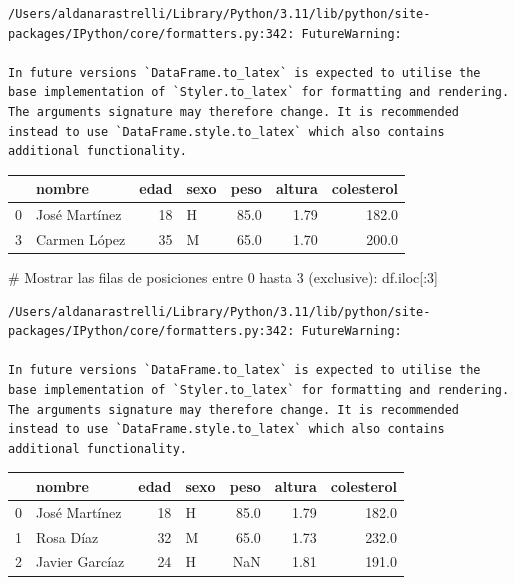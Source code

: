 \documentclass[
  letterpaper,
  DIV=11,
  numbers=noendperiod]{scrreprt}
\newenvironment{Shaded}{\begin{snugshade}}{\end{snugshade}}
\newcommand{\CommentTok}[1]{\textcolor[rgb]{0.37,0.37,0.37}{#1}}
\newcommand{\DecValTok}[1]{\textcolor[rgb]{0.68,0.00,0.00}{#1}}
\newcommand{\NormalTok}[1]{\textcolor[rgb]{0.00,0.23,0.31}{#1}}
\begin{document}
\begin{verbatim}
/Users/aldanarastrelli/Library/Python/3.11/lib/python/site-packages/IPython/core/formatters.py:342: FutureWarning:

In future versions `DataFrame.to_latex` is expected to utilise the base implementation of `Styler.to_latex` for formatting and rendering. The arguments signature may therefore change. It is recommended instead to use `DataFrame.style.to_latex` which also contains additional functionality.
\end{verbatim}

\begin{tabular}{llrlrrr}
\toprule
{} &         nombre &  edad & sexo &  peso &  altura &  colesterol \\
\midrule
0 &  José Martínez &    18 &    H &  85.0 &    1.79 &       182.0 \\
3 &   Carmen López &    35 &    M &  65.0 &    1.70 &       200.0 \\
\bottomrule
\end{tabular}

\begin{Shaded}
\begin{Highlighting}[]
\CommentTok{\# Mostrar las filas de posiciones entre 0 hasta 3 (exclusive):}
\NormalTok{df.iloc[:}\DecValTok{3}\NormalTok{]}
\end{Highlighting}
\end{Shaded}

\begin{verbatim}
/Users/aldanarastrelli/Library/Python/3.11/lib/python/site-packages/IPython/core/formatters.py:342: FutureWarning:

In future versions `DataFrame.to_latex` is expected to utilise the base implementation of `Styler.to_latex` for formatting and rendering. The arguments signature may therefore change. It is recommended instead to use `DataFrame.style.to_latex` which also contains additional functionality.
\end{verbatim}

\begin{tabular}{llrlrrr}
\toprule
{} &          nombre &  edad & sexo &  peso &  altura &  colesterol \\
\midrule
0 &   José Martínez &    18 &    H &  85.0 &    1.79 &       182.0 \\
1 &       Rosa Díaz &    32 &    M &  65.0 &    1.73 &       232.0 \\
2 &  Javier Garcíaz &    24 &    H &   NaN &    1.81 &       191.0 \\
\bottomrule
\end{tabular}
\end{document}
